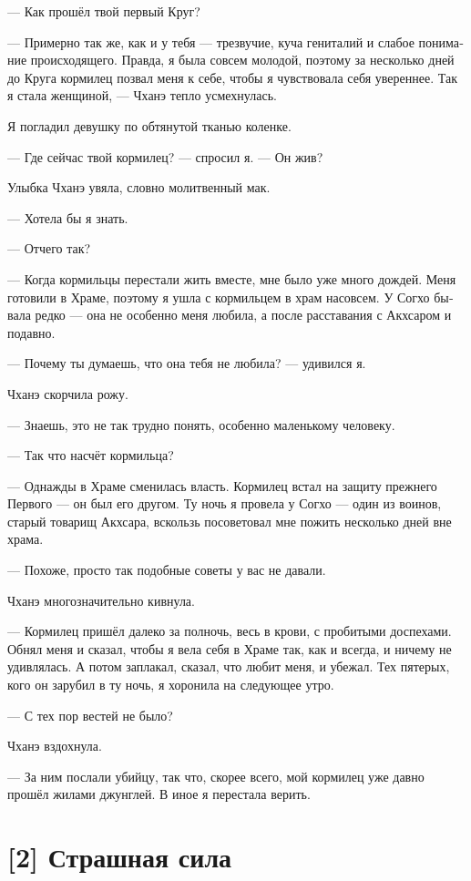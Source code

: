 \documentclass[a4paper,12pt,fleqn]{book}\usepackage{polyglossia}\setdefaultlanguage[babelshorthands=true]{russian}\setotherlanguage{english}\defaultfontfeatures{Ligatures=TeX,Mapping=tex-text}\usepackage{xcolor}\newcommand{\ml}[3]{#2}
\begin{document}
{--- Как прошёл твой первый Круг?

--- Примерно так же, как и у тебя --- трезвучие, куча гениталий и слабое понимание происходящего.
Правда, я была совсем молодой, поэтому за несколько дней до Круга кормилец позвал меня к себе, чтобы я чувствовала себя увереннее.
Так я стала женщиной, --- Чханэ тепло усмехнулась.

Я погладил девушку по обтянутой тканью коленке.

--- Где сейчас твой кормилец? --- спросил я.
--- Он жив?

Улыбка Чханэ увяла, словно молитвенный мак.

--- Хотела бы я знать.

--- Отчего так?

--- Когда кормильцы перестали жить вместе, мне было уже много дождей.
Меня готовили в Храме, поэтому я ушла с кормильцем в храм насовсем.
У Согхо бывала редко --- она не особенно меня любила, а после расставания с Акхсаром и подавно.

--- Почему ты думаешь, что она тебя не любила? --- удивился я.

Чханэ скорчила рожу.

--- Знаешь, это не так трудно понять, особенно маленькому человеку.

--- Так что насчёт кормильца?

--- Однажды в Храме сменилась власть.
Кормилец встал на защиту прежнего Первого --- он был его другом.
Ту ночь я провела у Согхо --- один из воинов, старый товарищ Акхсара, вскользь посоветовал мне пожить несколько дней вне храма.

--- Похоже, просто так подобные советы у вас не давали.

Чханэ многозначительно кивнула.

--- Кормилец пришёл далеко за полночь, весь в крови, с пробитыми доспехами.
Обнял меня и сказал, чтобы я вела себя в Храме так, как и всегда, и ничему не удивлялась.
А потом заплакал, сказал, что любит меня, и убежал.
Тех пятерых, кого он зарубил в ту ночь, я хоронила на следующее утро.

--- С тех пор вестей не было?

Чханэ вздохнула.

--- За ним послали убийцу, так что, скорее всего, мой кормилец уже давно прошёл жилами джунглей.
В иное я перестала верить.

\section{[2] Страшная сила}

}
\end{document}
